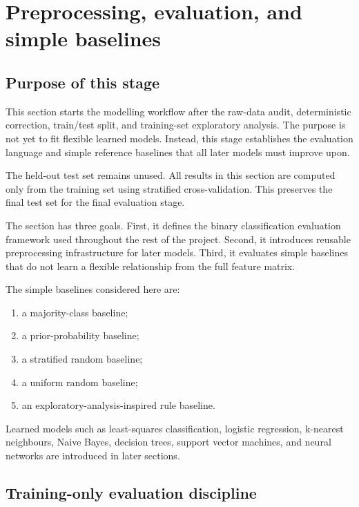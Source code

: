 \section{Preprocessing, evaluation, and simple baselines}
\label{sec:preprocessing-evaluation-simple-baselines}

\subsection{Purpose of this stage}

This section starts the modelling workflow after the raw-data audit, deterministic correction, train/test split, and training-set exploratory analysis. The purpose is not yet to fit flexible learned models. Instead, this stage establishes the evaluation language and simple reference baselines that all later models must improve upon.

The held-out test set remains unused. All results in this section are computed only from the training set using stratified cross-validation. This preserves the final test set for the final evaluation stage.

The section has three goals. First, it defines the binary classification evaluation framework used throughout the rest of the project. Second, it introduces reusable preprocessing infrastructure for later models. Third, it evaluates simple baselines that do not learn a flexible relationship from the full feature matrix.

The simple baselines considered here are:
\begin{enumerate}
    \item a majority-class baseline;
    \item a prior-probability baseline;
    \item a stratified random baseline;
    \item a uniform random baseline;
    \item an exploratory-analysis-inspired rule baseline.
\end{enumerate}

Learned models such as least-squares classification, logistic regression, k-nearest neighbours, Naive Bayes, decision trees, support vector machines, and neural networks are introduced in later sections.

\subsection{Training-only evaluation discipline}

